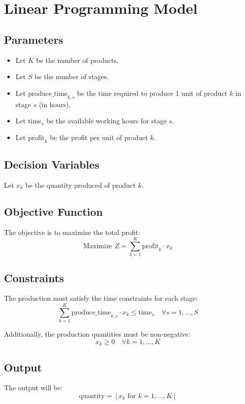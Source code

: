 \documentclass{article}
\begin{document}
\section*{Linear Programming Model}

\subsection*{Parameters}
\begin{itemize}
    \item Let \( K \) be the number of products.
    \item Let \( S \) be the number of stages.
    \item Let \( \text{produce\_time}_{k,s} \) be the time required to produce 1 unit of product \( k \) in stage \( s \) (in hours).
    \item Let \( \text{time}_s \) be the available working hours for stage \( s \).
    \item Let \( \text{profit}_k \) be the profit per unit of product \( k \).
\end{itemize}

\subsection*{Decision Variables}
Let \( x_k \) be the quantity produced of product \( k \).

\subsection*{Objective Function}
The objective is to maximize the total profit:
\[
\text{Maximize } Z = \sum_{k=1}^{K} \text{profit}_k \cdot x_k
\]

\subsection*{Constraints}
The production must satisfy the time constraints for each stage:
\[
\sum_{k=1}^{K} \text{produce\_time}_{k,s} \cdot x_k \leq \text{time}_s \quad \forall s = 1, \ldots, S
\]

Additionally, the production quantities must be non-negative:
\[
x_k \geq 0 \quad \forall k = 1, \ldots, K
\]

\subsection*{Output}
The output will be:
\[
\text{quantity} = [x_k \text{ for } k = 1, \ldots, K]
\]
\end{document}
